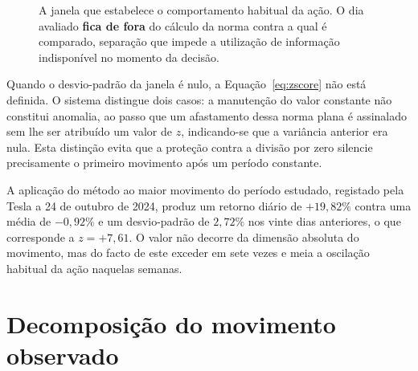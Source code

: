 \begin{figure}[ht]
\centering
{}
\caption[A janela deslizante do \emph{z}-score]{A janela que estabelece o comportamento habitual da
ação. O dia avaliado \textbf{fica de fora} do cálculo da norma contra a qual é comparado, separação
que impede a utilização de informação indisponível no momento da decisão.}
\label{fig:met_janela}
\end{figure}

Quando o desvio-padrão da janela é nulo, a Equação~\ref{eq:zscore} não está definida. O sistema
distingue dois casos: a manutenção do valor constante não constitui anomalia, ao passo que um
afastamento dessa norma plana é assinalado sem lhe ser atribuído um valor de $z$, indicando-se que
a variância anterior era nula. Esta distinção evita que a proteção contra a divisão por zero
silencie precisamente o primeiro movimento após um período constante.

A aplicação do método ao maior movimento do período estudado, registado pela Tesla a 24 de outubro
de 2024, produz um retorno diário de $+19{,}82\%$ contra uma média de $-0{,}92\%$ e um
desvio-padrão de $2{,}72\%$ nos vinte dias anteriores, o que corresponde a $z = +7{,}61$. O valor
não decorre da dimensão absoluta do movimento, mas do facto de este exceder em sete vezes e meia a
oscilação habitual da ação naquelas semanas.


\section{Decomposição do movimento observado}
\label{sec:met_decomposicao}

